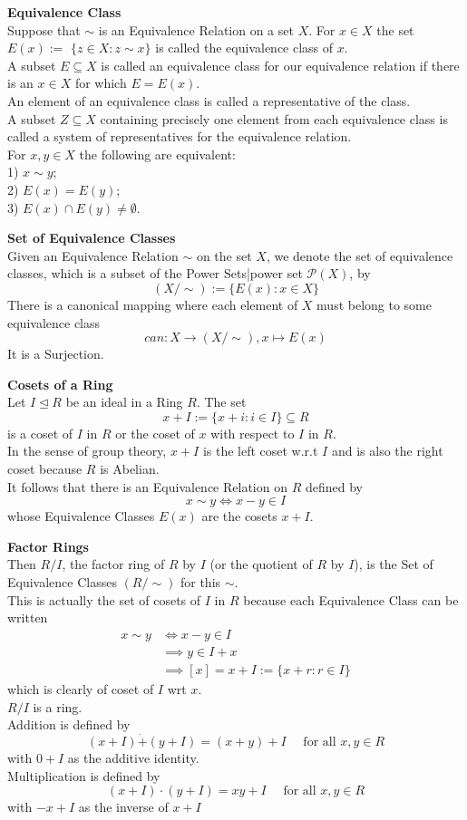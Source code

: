\documentclass[a4paper, 10pt]{article}
\begin{document}
\begin{multicols*}{3}
\textbf{Equivalence Class}\\
Suppose that $\sim$ is an Equivalence Relation on a set $X$. For $x \in X$ the set $E(x):=$ $\{z \in X: z \sim x\}$ is called the equivalence class of $x$. \\
A subset $E \subseteq X$ is called an equivalence class for our equivalence relation if there is an $x \in X$ for which $E=E(x)$. \\
An element of an equivalence class is called a representative of the class. \\
A subset $Z \subseteq X$ containing precisely one element from each equivalence class is called a system of representatives for the equivalence relation.\\
For $x, y \in X$ the following are equivalent:\\
1) $x \sim y$;\\
2) $E(x)=E(y)$;\\
3) $E(x) \cap E(y) \neq \emptyset$.

\textbf{Set of Equivalence Classes}\\
Given an Equivalence Relation $\sim$ on the set $X$, we denote the set of equivalence classes, which is a subset of the Power Sets|power set $\mathcal{P}(X)$, by
$$
(X / \sim):=\{E(x): x \in X\}
$$
There is a canonical mapping where each element of $X$ must belong to some equivalence class\\
$$can : X \rightarrow(X / \sim), x \mapsto E(x)$$
It is a Surjection.

\textbf{Cosets of a Ring}\\
Let $I \unlhd R$ be an ideal in a Ring $R$. The set
$$
x+I:=\{x+i: i \in I\} \subseteq R
$$
is a coset of $I$ in $R$ or the coset of $x$ with respect to $I$ in $R$.\\
In the sense of group theory, $x+I$ is the left coset w.r.t $I$ and is also the right coset because $R$ is Abelian. \\
It follows that there is an Equivalence Relation on $R$ defined by 
$$x\sim y \iff x - y \in I$$
whose Equivalence Classes $E(x)$ are the cosets $x+I$.

\textbf{Factor Rings}\\
Then $R / I$, the factor ring of $R$ by $I$ (or the quotient of $R$ by $I$), is the Set of Equivalence Classes $(R / \sim)$ for this $\sim$.\\
This is actually the set of cosets of $I$ in $R$ because each Equivalence Class can be written 
\begin{align*}
x \sim y &\iff x-y \in I\\
&\implies y\in I+x\\
&\implies[x]=x+I:=\{x+r:r\in I\}
\end{align*}
which is clearly of coset of $I$ wrt $x$. \\
$R/I$  is a ring.\\
Addition is defined by
$$
(x+I) \dot{+}(y+I)=(x+y)+I \quad \text { for all } x, y \in R
$$
with $0+I$ as the additive identity. \\
Multiplication is defined by
$$
(x+I) \cdot(y+I)=x y+I \quad \text { for all } x, y \in R
$$
with $-x+I$ as the inverse of $x+I$


\end{multicols*}
\end{document}
